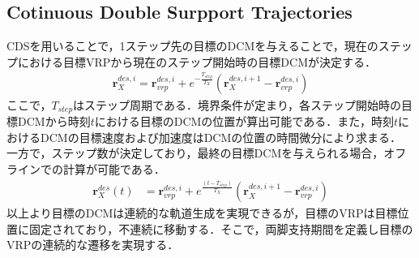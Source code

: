\documentclass[twocolumn]{jsarticle}
\begin{document}
\subsection{Cotinuous Double Surpport Trajectories}
CDSを用いることで，1ステップ先の目標のDCMを与えることで，現在のステップにおける目標VRPから現在のステップ開始時の目標DCMが決定する．
\begin{align}
  \bm{r}_X^{des,i}=
  \bm{r}_{vrp}^{des,i}
  +e^{-\frac{T_{step}}{T_X}}(\bm{r}_{X}^{des,i+1}-\bm{r}_{vrp}^{des,i})
\end{align}
ここで，$T_{step}$はステップ周期である．境界条件が定まり，各ステップ開始時の目標DCMから時刻$t$における目標のDCMの位置が算出可能である．また，時刻$t$におけるDCMの目標速度および加速度はDCMの位置の時間微分により求まる．
一方で，ステップ数が決定しており，最終の目標DCMを与えられる場合，オフラインでの計算が可能である．
\begin{align}
  \bm{r}_X^{des}(t)&= \bm{r}_{vrp}^{des,i}+e^{\frac{(t-T_{step})}{T_X}}(\bm{r}_{X}^{des,i+1}-\bm{r}_{vrp}^{des,i})
\end{align}
以上より目標のDCMは連続的な軌道生成を実現できるが，目標のVRPは目標位置に固定されており，不連続に移動する．そこで，両脚支持期間を定義し目標のVRPの連続的な遷移を実現する．
\end{document}
